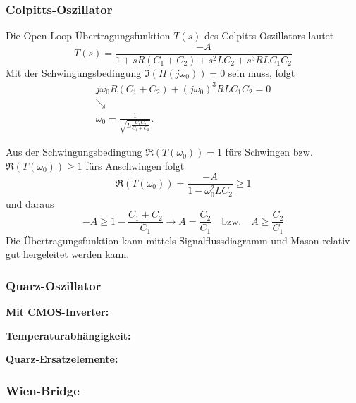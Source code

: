 \subsubsection{Colpitts-Oszillator}
\begin{minipage}{0.4\columnwidth}
    
\end{minipage}
\hfill
\begin{minipage}{0.55\columnwidth}
    Die Open-Loop Übertragungsfunktion $T(s)$ des Colpitts-Oszillators lautet
    \begin{equation*}
        T(s)
        = \frac{-A}{1+sR(C_1+C_2) + s^2 LC_2 + s^3RLC_1C_2}
    \end{equation*}
    Mit der Schwingungsbedingung $\Im(H(j\omega_0)) = 0$ sein muss, folgt
    \begin{multline*}
        j\omega_0 R(C_1+C_2) + {(j\omega_0)}^3 RLC_1C_2 
        = 0 \\
        \searrow \\
        \omega_0 
        = \frac{1}{\sqrt{L\frac{C_1 C_2}{C_1 + C_2}}}.
    \end{multline*}
\end{minipage}
Aus der Schwingungsbedingung $\Re(T(\omega_0)) = 1$ fürs Schwingen bzw. $\Re(T(\omega_0)) \geq 1$ fürs Anschwingen folgt
\begin{equation*}
    \Re(T(\omega_0))
    = \frac{-A}{1-\omega_0^2LC_2}
    \geq 1
\end{equation*}
und daraus
\begin{equation*}
    -A
    \geq 1 - \frac{C_1 + C_2}{C_1}
    \rightarrow
    A = \frac{C_2}{C_1}
    \quad \text{bzw.} \quad
    A \geq \frac{C_2}{C_1}
\end{equation*}
Die Übertragungsfunktion kann mittels Signalflussdiagramm und Mason relativ gut hergeleitet werden kann.

\subsubsection{Quarz-Oszillator}


\textbf{Mit CMOS-Inverter:}



\textbf{Temperaturabhängigkeit:}



\textbf{Quarz-Ersatzelemente:}



\subsubsection{Wien-Bridge}